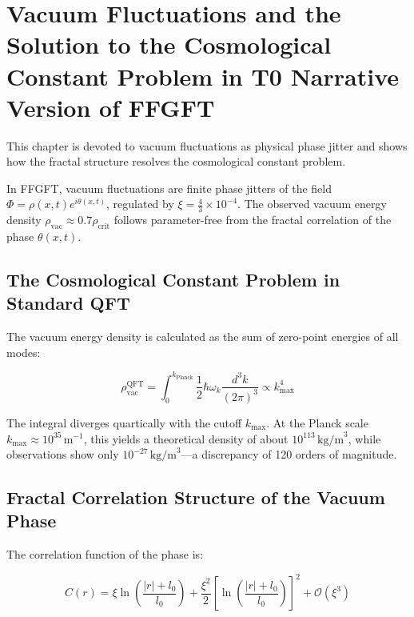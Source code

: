 \chapter{Vacuum Fluctuations and the Solution to the Cosmological Constant Problem in T0  Narrative Version of FFGFT}


	
	This chapter is devoted to vacuum fluctuations as physical phase jitter and shows how the fractal structure resolves the cosmological constant problem.
	
	
	In FFGFT, vacuum fluctuations are finite phase jitters of the field $\Phi = \rho(x,t) e^{i\theta(x,t)}$, regulated by $\xi = \frac{4}{3} \times 10^{-4}$. The observed vacuum energy density $\rho_{\text{vac}} \approx 0.7 \rho_{\text{crit}}$ follows parameter-free from the fractal correlation of the phase $\theta(x,t)$.
	
	\section*{The Cosmological Constant Problem in Standard QFT}
	
	The vacuum energy density is calculated as the sum of zero-point energies of all modes:
	
	\begin{equation}
		\rho_{\text{vac}}^{\text{QFT}} = \int_0^{k_{\text{Planck}}} \frac{1}{2} \hbar \omega_k \frac{d^3k}{(2\pi)^3} \propto k_{\max}^4
	\end{equation}
	
	The integral diverges quartically with the cutoff $k_{\max}$. At the Planck scale $k_{\max} \approx 10^{35} \, \text{m}^{-1}$, this yields a theoretical density of about $10^{113} \, \text{kg/m}^3$, while observations show only $10^{-27} \, \text{kg/m}^3$—a discrepancy of 120 orders of magnitude.
	
	\section*{Fractal Correlation Structure of the Vacuum Phase}
	
	The correlation function of the phase is:
	
	\begin{equation}
		C(r) = \xi \ln \left( \frac{|r| + l_0}{l_0} \right) + \frac{\xi^2}{2} \left[ \ln \left( \frac{|r| + l_0}{l_0} \right) \right]^2 + \mathcal{O}(\xi^3)
	\end{equation}
	

